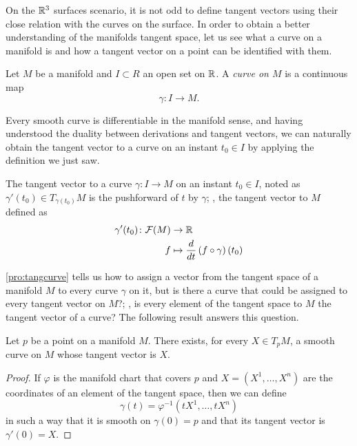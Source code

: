 On the $\mathbb{R}^3$ surfaces scenario, it is not odd to define tangent vectors using their close relation with the curves on the surface. In order to obtain a better understanding of the manifolds tangent space, let us see what a curve on a manifold is and how a tangent vector on a point can be identified with them.

\begin{definition}
	Let $M$ be a manifold and $I \subset R$ an open set on $\mathbb{R}$. A \emph{curve on $M$} is a continuous map
	\[
		\gamma \colon I \to M.
	\]
\end{definition}

Every smooth curve is differentiable in the manifold sense, and having understood the duality between derivations and tangent vectors, we can naturally obtain the tangent vector to a curve on an instant $t_0\in I$ by applying the definition we just saw.

\begin{proposition}
	\label{pro:tangcurve}
	The tangent vector to a curve $\gamma \colon I \to M$ on an instant $t_0 \in I$, noted as $\gamma'(t_0) \in T_{\gamma(t_0)} M$ is the pushforward of $t$ by $\gamma$; \ie, the tangent vector to $M$ defined as
	\begin{align*}
		\gamma'(t_0) \colon \mathcal{F}(M) &\to \mathbb{R} \\
		f &\mapsto \frac{d}{dt} \left( f \circ \gamma \right) (t_0)
	\end{align*}
\end{proposition}

\autoref{pro:tangcurve} tells us how to assign a vector from the tangent space of a manifold $M$ to every curve $\gamma$ on it, but is there a curve that could be assigned to every tangent vector on $M$?; \ie, is every element of the tangent space to $M$ the tangent vector of a curve? The following result answers this question.

\begin{theorem}
	Let $p$ be a point on a manifold $M$. There exists, for every $X \in T_p M$, a smooth curve on $M$ whose tangent vector is $X$.
\end{theorem}

\begin{proof}
	If $\varphi$ is the manifold chart that covers $p$ and $X = (X^1, \dots, X^n)$ are the coordinates of an element of the tangent space, then we can define
	\[
		\gamma(t) = \varphi^{-1}(tX^1, \dots, tX^n)
	\]
	in such a way that it is smooth on $\gamma(0) = p$ and that its tangent vector is $\gamma'(0) = X$.
\end{proof}

